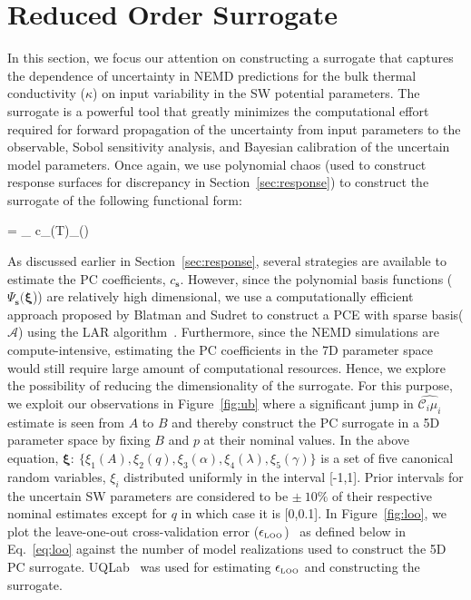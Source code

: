 \section{Reduced Order Surrogate}
\label{sec:ros}

In this section, we focus our attention on constructing a surrogate that captures the dependence of
uncertainty in NEMD predictions for the bulk thermal conductivity ($\kappa$) on input variability
in the SW potential parameters. The surrogate is a powerful tool that greatly minimizes
the computational
effort required for forward propagation of the uncertainty from input parameters to the observable,
Sobol sensitivity analysis, and Bayesian calibration of the uncertain model parameters. Once again,
we use polynomial chaos (used to construct response surfaces for discrepancy in
Section~\ref{sec:response}) to construct the surrogate of the following functional form:

\be
\kappa  = \sum\limits_{\in{}} c_{}(T)\Psi_{}(\bm{\xi})
\ee

As discussed earlier in Section~\ref{sec:response}, several strategies are available to
estimate the PC coefficients, $c_{\bm{s}}$. However, since the polynomial basis functions
($\Psi_{\bm{s}}(\bm{\xi}$)) are
relatively high dimensional, we use a computationally efficient approach proposed by
Blatman and Sudret to construct a PCE with sparse basis($\mathcal{A}$) using the LAR
algorithm~\cite{Blatman:2011}. Furthermore, since the NEMD simulations are compute-intensive,
estimating the PC coefficients in the 7D parameter space would still require large amount of
computational resources. Hence, we explore the possibility of reducing the dimensionality of
the surrogate. For this purpose, we 
exploit our observations in Figure~\ref{fig:ub} where a significant
jump in $\hat{\mathcal{C}_i\mu_i}$ estimate is seen from $A$ to $B$ and thereby construct the 
PC surrogate in a 5D parameter space by fixing $B$ and $p$ at their nominal values. In the above
equation, $\bm{\xi}:~\{\xi_1(A),\xi_2(q),\xi_3(\alpha),\xi_4(\lambda),\xi_5(\gamma)\}$ is a set
of five canonical random variables, $\xi_i$ distributed uniformly in the interval [-1,1].
Prior intervals for the uncertain SW parameters are considered to be
$\pm~10\%$ of their respective nominal estimates except for $q$ in which case it is [0,0.1]. In
Figure~\ref{fig:loo}, we plot the leave-one-out cross-validation error 
($\epsilon_{\tiny{\mbox{LOO}}}$)~\cite{Blatman:2010} as defined
below in Eq.~\ref{eq:loo} against the number of model realizations used to construct the 5D
PC surrogate. UQLab~\cite{Marelli:2014} was used for estimating $\epsilon_{\tiny{\mbox{LOO}}}$ and constructing
the surrogate. 


